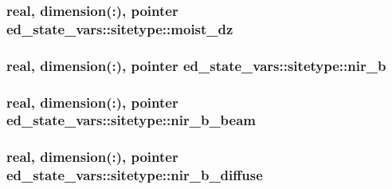 \subsubsection[{\texorpdfstring{moist\+\_\+dz}{moist_dz}}]{\setlength{\rightskip}{0pt plus 5cm}real, dimension(\+:), pointer ed\+\_\+state\+\_\+vars\+::sitetype\+::moist\+\_\+dz}\hypertarget{structed__state__vars_1_1sitetype_abdc641333ff2d0678bb0d304e42b9944}{}\label{structed__state__vars_1_1sitetype_abdc641333ff2d0678bb0d304e42b9944}
\subsubsection[{\texorpdfstring{nir\+\_\+b}{nir_b}}]{\setlength{\rightskip}{0pt plus 5cm}real, dimension(\+:), pointer ed\+\_\+state\+\_\+vars\+::sitetype\+::nir\+\_\+b}\hypertarget{structed__state__vars_1_1sitetype_a05f3305fc8182b54e6e5f693df2fd7bb}{}\label{structed__state__vars_1_1sitetype_a05f3305fc8182b54e6e5f693df2fd7bb}
\subsubsection[{\texorpdfstring{nir\+\_\+b\+\_\+beam}{nir_b_beam}}]{\setlength{\rightskip}{0pt plus 5cm}real, dimension(\+:), pointer ed\+\_\+state\+\_\+vars\+::sitetype\+::nir\+\_\+b\+\_\+beam}\hypertarget{structed__state__vars_1_1sitetype_a5dc746aa17b70a3b4807ec54e5b3b7be}{}\label{structed__state__vars_1_1sitetype_a5dc746aa17b70a3b4807ec54e5b3b7be}
\subsubsection[{\texorpdfstring{nir\+\_\+b\+\_\+diffuse}{nir_b_diffuse}}]{\setlength{\rightskip}{0pt plus 5cm}real, dimension(\+:), pointer ed\+\_\+state\+\_\+vars\+::sitetype\+::nir\+\_\+b\+\_\+diffuse}\hypertarget{structed__state__vars_1_1sitetype_a289ffcddfed5f8abd4fae9fba934dc6d}{}\label{structed__state__vars_1_1sitetype_a289ffcddfed5f8abd4fae9fba934dc6d}
